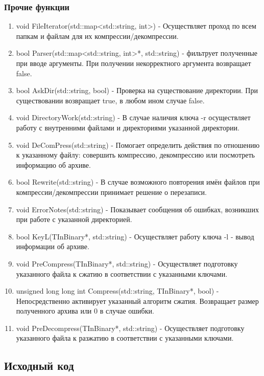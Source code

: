 \documentclass[12pt]{article}
\begin{document}
\subsubsection*{Прочие функции}
\noindent
\begin{enumerate} 
	\item void FileIterator(std::map<std::string, int>) - Осуществляет проход по всем папкам и файлам для их компрессии/декомпрессии.
	\item bool Parser(std::map<std::string, int>*, std::string) - фильтрует полученные при вводе аргументы. При получении некорректного аргумента возвращает false.
	\item bool AskDir(std::string, bool) - Проверка на существование директории. При существовании возвращает true, в любом ином случае false.
	\item void DirectoryWork(std::string) - В случае наличия ключа -r осуществляет работу с внутренними файлами и директориями указанной директории.
	\item void DeComPress(std::string) - Помогает определить действия по отношению к указанному файлу: совершить компрессию, декомпрессию или посмотреть информацию об архиве.
	\item bool Rewrite(std::string) - В случае возможного повторения имён файлов при компрессии/декомпрессии принимает решение о перезаписи.
	\item void ErrorNotes(std::string) - Показывает сообщения об ошибках, возникших при работе с указанной директорией.
	\item bool KeyL(TInBinary*, std::string) - Осуществляет работу ключа -l - вывод информации об архиве.
	\item void PreCompress(TInBinary*, std::string) - Осуществляет подготовку указанного файла к сжатию в соответствии с указанными ключами.
	\item unsigned long long int Compress(std::string, TInBinary*, bool) - Непосредственно активирует указанный алгоритм сжатия. Возвращает размер полученного архива или 0 в случае ошибки.
	\item void PreDecompress(TInBinary*, std::string) - Осуществляет подготовку указанного файла к разжатию в соответствии с указанными ключами.
\end{enumerate}

\subsection*{Исходный код}
\end{document}
